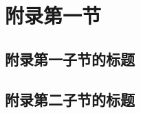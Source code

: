 
\section{附录第一节}

\zhlipsum[1]

\subsection{附录第一子节的标题}

\zhlipsum

\subsection{附录第二子节的标题}

\zhlipsum
